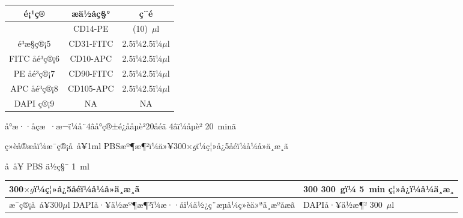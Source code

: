 \documentclass[UTF8,10pt,a4paper,fontset=fandol]{ctexart}
\newcommand{\fieldvalue}[1]{#1}
\newcommand{\handwritten}[1]{#1}
\begin{document}
\begin{tabularx}{\textwidth}{|c|c|c|}
\hline
\textbf{é¡¹ç®} & \textbf{æä½åç§°} & \textbf{ç¨é} \\
\hline
 & CD14-PE & (10)~$\mu$l \\
\hline
é³æ§ç®¡5 & CD31-FITC &
\fieldvalue{\handwritten{2.5}}ï¼2.5ï¼$\mu$l \\
\hline
FITC åé³ç®¡6 & CD10-APC &
\fieldvalue{\handwritten{2.5}}ï¼2.5ï¼$\mu$l \\
\hline
PE åé³ç®¡7 & CD90-FITC &
\fieldvalue{\handwritten{2.5}}ï¼2.5ï¼$\mu$l \\
\hline
APC åé³ç®¡8 & CD105-APC &
\fieldvalue{\handwritten{2.5}}ï¼2.5ï¼$\mu$l \\
\hline
DAPI ç®¡9 & NA & NA \\
\hline
\end{tabularx}

\vspace{2mm}

å°æ··åçæ ·æ¬ï¼å¨4âå°ç®±é¿åå­µè²20åéã
\fieldvalue{\handwritten{4}}âï¼å­µè²
\fieldvalue{\handwritten{20}}~minã

\noindent
ç»èå®æåï¼æ¯ç®¡å å¥1ml PBSæº¶æ¶²ï¼ä»¥300$\times g$ï¼ç¦»å¿5åéï¼å¼å»ä¸æ¸ã
\begin{flushright}
å å¥ PBS ä½ç§¯
\fieldvalue{\handwritten{1}}~ml
\end{flushright}

\noindent
\begin{tabularx}{\textwidth}{|X|X|}
\hline
300$\times g$ï¼ç¦»å¿5åéï¼å¼å»ä¸æ¸ã &
300
\fieldvalue{\handwritten{300}}~gï¼
\fieldvalue{\handwritten{5}}~min ç¦»å¿ï¼\fieldvalue{\handwritten{å¼ä¸æ¸}} \\
\hline
æ¯ç®¡å å¥300$\mu$l DAPIå·¥ä½æº¶æ¶²ï¼æ··åï¼ä½¿ç¨æµå¼ç»èä»ªä¸æºåæã &
DAPIå·¥ä½æ¶²
\fieldvalue{\handwritten{300}}~$\mu$l \\
\hline
\end{tabularx}
\end{document}
